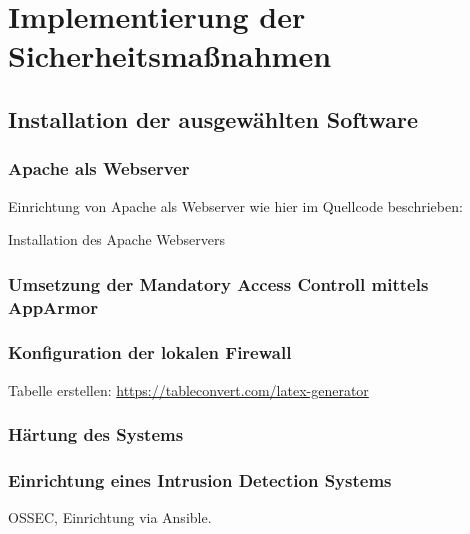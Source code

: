 \section{Implementierung der Sicherheitsmaßnahmen}

\subsection{Installation der ausgewählten Software}

\subsubsection{Apache als Webserver}

Einrichtung von Apache als Webserver wie hier im Quellcode beschrieben:

\begin{listing}[ht]{}
    \caption{Installation des Apache Webservers}
    \label{listing:installation_apache}
\end{listing}

\subsubsection{Umsetzung der Mandatory Access Controll mittels AppArmor}

\subsubsection{Konfiguration der lokalen Firewall}

Tabelle erstellen: \url{https://tableconvert.com/latex-generator}

\subsubsection{Härtung des Systems}


\subsubsection{Einrichtung eines Intrusion Detection Systems}

OSSEC, Einrichtung via Ansible.